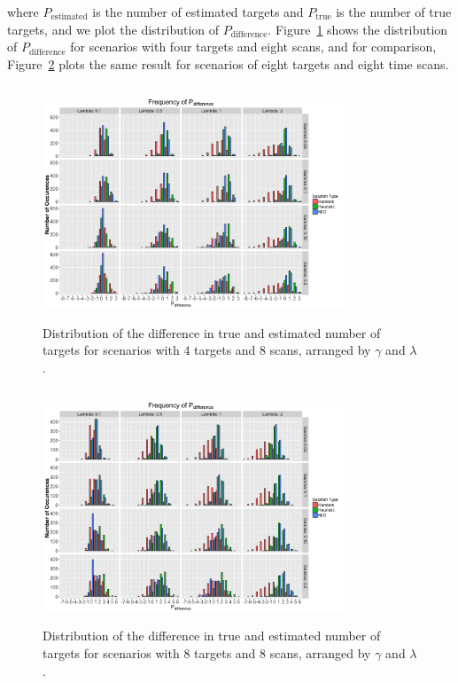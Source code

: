 \documentclass[journal]{IEEEtran}
\begin{document}
where $P_{\text{estimated}}$ is the number of estimated targets and $P_{\text{true}}$ is the number of true targets, and we plot the distribution of $P_{\text{difference}}$. Figure~\ref{fig:Robust_4_8_Histogram} shows the distribution of $P_{\text{difference}}$ for scenarios with four targets and eight scans, and for comparison, Figure~\ref{fig:Robust_8_8_Histogram} plots the same result for scenarios of eight targets and eight time scans. 
\begin{figure}[h]
  \centering
  \includegraphics[width=9cm, height=7cm]{4_8_Histogram}
  \caption{Distribution of the difference in true and estimated number of targets for scenarios with 4 targets and 8 scans, arranged by $\gamma$ and $\lambda$.}
  \label{fig:Robust_4_8_Histogram}
\end{figure}

\begin{figure}[h]
  \centering
  \includegraphics[width=9cm, height=7cm]{8_8_Histogram}
  \caption{Distribution of the difference in true and estimated number of targets for scenarios with 8 targets and 8 scans, arranged by $\gamma$ and $\lambda$.}
  \label{fig:Robust_8_8_Histogram}
\end{figure}
\end{document}
